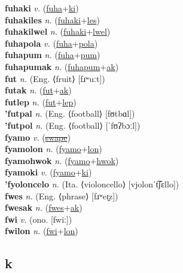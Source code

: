 \textbf{fuhaki} \textit{v.} (\hyperref[fuha]{fuha}+\hyperref[ki]{ki})
 \label{fuhaki} \\
\textbf{fuhakiles} \textit{n.} (\hyperref[fuhaki]{fuhaki}+\hyperref[les]{les})
 \label{fuhakiles} \\
\textbf{fuhakilwel} \textit{n.} (\hyperref[fuhaki]{fuhaki}+\hyperref[lwel]{lwel})
 \label{fuhakilwel} \\
\textbf{fuhapola} \textit{v.} (\hyperref[fuha]{fuha}+\hyperref[pola]{pola})
 \label{fuhapola} \\
\textbf{fuhapum} \textit{n.} (\hyperref[fuha]{fuha}+\hyperref[pum]{pum})
 \label{fuhapum} \\
\textbf{fuhapumak} \textit{n.} (\hyperref[fuhapum]{fuhapum}+\hyperref[ak]{ak})
 \label{fuhapumak} \\
\textbf{fut} \textit{n.} (Eng. ⟨fruit⟩ [fɹʷuːt])
 \label{fut} \\
\textbf{futak} \textit{n.} (\hyperref[fut]{fut}+\hyperref[ak]{ak})
 \label{futak} \\
\textbf{futlep} \textit{n.} (\hyperref[fut]{fut}+\hyperref[lep]{lep})
 \label{futlep} \\
\textbf{'futpal} \textit{n.} (Eng. ⟨football⟩ [fʊtbɑl])
 \label{'futpal} \\
\textbf{'futpol} \textit{n.} (Eng. ⟨football⟩ [ˈfʊʔbɔːl])
 \label{'futpol} \\
\textbf{fyamo} \textit{v.} (\hyperref[swape]{\sout{swape}})
 \label{fyamo} \\
\textbf{fyamolon} \textit{n.} (\hyperref[fyamo]{fyamo}+\hyperref[lon]{lon})
 \label{fyamolon} \\
\textbf{fyamohwok} \textit{n.} (\hyperref[fyamo]{fyamo}+\hyperref[hwok]{hwok})
 \label{fyamohwok} \\
\textbf{fyamoki} \textit{v.} (\hyperref[fyamo]{fyamo}+\hyperref[ki]{ki})
 \label{fyamoki} \\
\textbf{'fyoloncelo} \textit{n.} (Ita. ⟨violoncello⟩ [vjolonˈt͡ʃɛllo])
 \label{'fyoloncelo} \\
\textbf{fwes} \textit{n.} (Eng. ⟨phrase⟩ [fɹʷeɪ̯z])
 \label{fwes} \\
\textbf{fwesak} \textit{n.} (\hyperref[fwes]{fwes}+\hyperref[ak]{ak})
 \label{fwesak} \\
\textbf{fwi} \textit{v.} (ono. [fwiː])
 \label{fwi} \\
\textbf{fwilon} \textit{n.} (\hyperref[fwi]{fwi}+\hyperref[lon]{lon})
 \label{fwilon} \\
\subsection{k}

